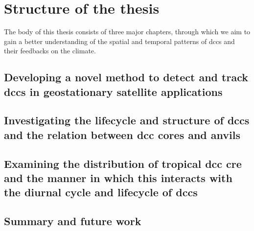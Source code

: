 \section{Structure of the thesis}

The body of this thesis consists of three major chapters, through which we aim to gain a better understanding of the spatial and temporal patterns of \acrshort{dcc}s and their feedbacks on the climate.


\subsection{Developing a novel method to detect and track \acrshort{dcc}s in geostationary satellite applications}

\subsection{Investigating the lifecycle and structure of \acrshort{dcc}s and the relation between \acrshort{dcc} cores and anvils}

\subsection{Examining the distribution of tropical \acrshort{dcc} \acrshort{cre} and the manner in which this interacts with the diurnal cycle and lifecycle of \acrshort{dcc}s}

\subsection{Summary and future work}